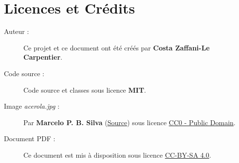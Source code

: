 \documentclass[theme=acerola]{myrtille}
\begin{document}
\section{Licences et Crédits}
\begin{description}
    \item[Auteur :] Ce projet et ce document ont été créés par \textbf{Costa Zaffani-Le Carpentier}.
    \item[Code source :] Code source  et classes  sous licence \textbf{MIT}.
    \item[Image \textit{acerola.jpg} :] Par \textbf{Marcelo P. B. Silva} (\href{https://commons.wikimedia.org/wiki/File:Acerola_Malpighia_glabra.jpg}{Source}) sous licence \href{https://creativecommons.org/publicdomain/zero/1.0/deed.fr}{CC0 - Public Domain}.
    \item[Document PDF :] Ce document est mis à disposition sous licence \href{https://creativecommons.org/licenses/by-sa/4.0/deed.fr}{CC-BY-SA 4.0}.
\end{description}
\end{document}
